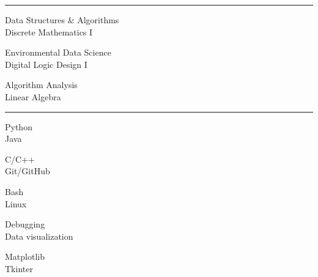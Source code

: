 \documentclass[letter]{article}
\begin{document}
    \vspace{4pt}
    \hrule height 1pt
    \vspace{4pt}
    \noindent
    \begin{minipage}[c]{0.415\linewidth}
        \noindent Data Structures \& Algorithms \\
        \noindent Discrete Mathematics I \\
    \end{minipage}
    \begin{minipage}[c]{0.415\linewidth}
        \noindent Environmental Data Science \\
        \noindent Digital Logic Design I \\
    \end{minipage}
    \begin{minipage}[c]{0.415\linewidth}
        \noindent Algorithm Analysis \\
        \noindent Linear Algebra \\
    \end{minipage}

    \vspace{4pt}
    \hrule height 1pt
    \vspace{4pt}
    \noindent
    \begin{minipage}[c]{0.22\linewidth}
        \noindent Python \\
        \noindent Java \\
    \end{minipage}
    \begin{minipage}[c]{0.22\linewidth}
        \noindent C/C++ \\
        \noindent Git/GitHub \\
    \end{minipage}
    \begin{minipage}[c]{0.22\linewidth}
        \noindent Bash \\
        \noindent Linux \\
    \end{minipage}
    \begin{minipage}[c]{0.22\linewidth}
        \noindent Debugging \\
        \noindent Data visualization \\
    \end{minipage}
    \begin{minipage}[c]{0.22\linewidth}
        \noindent Matplotlib \\
        \noindent Tkinter \\
    \end{minipage}
\end{document}
